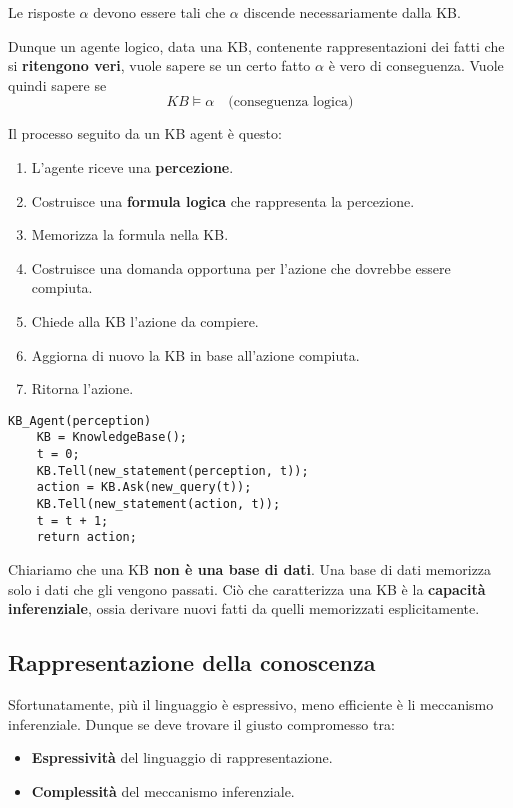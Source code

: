 Le risposte $\alpha$ devono essere tali che $\alpha$ discende necessariamente dalla KB.

Dunque un agente logico, data una KB, contenente rappresentazioni dei fatti che si \textbf{ritengono veri},
vuole sapere se un certo fatto $\alpha$ \`e vero di conseguenza. Vuole quindi sapere se
\[ KB \models \alpha \quad \text{(conseguenza logica)} \]

Il processo seguito da un KB agent \`e questo:
\begin{enumerate}
	\item L'agente riceve una \textbf{percezione}.
	\item Costruisce una \textbf{formula logica} che rappresenta la percezione.
	\item Memorizza la formula nella KB.
	\item Costruisce una domanda opportuna per l'azione che dovrebbe essere compiuta.
	\item Chiede alla KB l'azione da compiere.
	\item Aggiorna di nuovo la KB in base all'azione compiuta.
	\item Ritorna l'azione.
\end{enumerate}

\begin{lstlisting}[style=pseudo-style]
KB_Agent(perception)
	KB = KnowledgeBase();
	t = 0;
	KB.Tell(new_statement(perception, t));
	action = KB.Ask(new_query(t));
	KB.Tell(new_statement(action, t));
	t = t + 1;
	return action;
\end{lstlisting}
Chiariamo che una KB \textbf{non \`e una base di dati}. Una base di dati memorizza solo i dati che gli vengono passati. Ci\`o che
caratterizza una KB \`e la \textbf{capacit\`a inferenziale}, ossia derivare nuovi fatti da quelli memorizzati esplicitamente.

\subsection{Rappresentazione della conoscenza}
Sfortunatamente, pi\`u il linguaggio \`e espressivo, meno efficiente \`e li meccanismo inferenziale. Dunque se deve trovare il giusto
compromesso tra:
\begin{itemize}
	\item \textbf{Espressivit\`a} del linguaggio di rappresentazione.
	\item \textbf{Complessit\`a} del meccanismo inferenziale.
\end{itemize}

